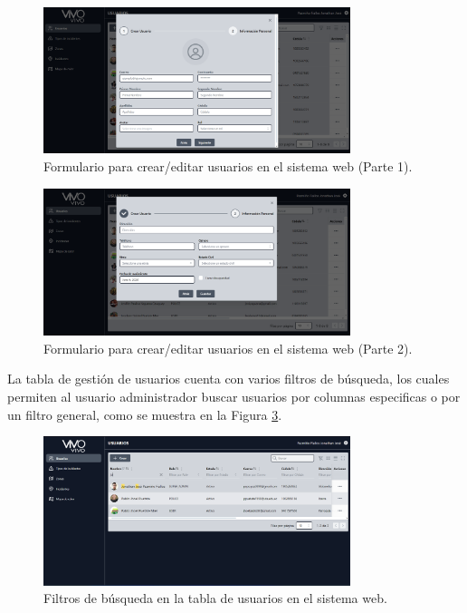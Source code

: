 \begin{figure}[H]
    \centering
    \includegraphics[width=0.8\textwidth]{chapters/III-resultados-y-discusion/resources/images/formulario-usuario-web-1.png}
    \caption{Formulario para crear/editar usuarios en el sistema web (Parte 1).}
    \label{fig:formulario-usuario-web-1}
\end{figure}

\begin{figure}[H]
    \centering
    \includegraphics[width=0.8\textwidth]{chapters/III-resultados-y-discusion/resources/images/formulario-usuario-web-2.png}
    \caption{Formulario para crear/editar usuarios en el sistema web (Parte 2).}
    \label{fig:formulario-usuario-web-2}
\end{figure}

La tabla de gestión de usuarios cuenta con varios filtros de búsqueda, los cuales permiten al usuario administrador buscar usuarios por
columnas especificas o por un filtro general, como se muestra en la Figura \ref{fig:filtros-tabla-usuarios-web}.

\begin{figure}[H]
    \centering
    \includegraphics[width=0.8\textwidth]{chapters/III-resultados-y-discusion/resources/images/filtros-tabla-usuarios-web.png}
    \caption{Filtros de búsqueda en la tabla de usuarios en el sistema web.}
    \label{fig:filtros-tabla-usuarios-web}
\end{figure}

